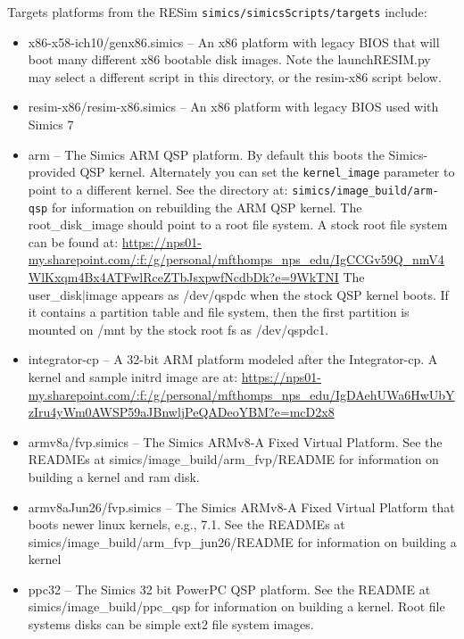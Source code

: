 \documentclass[titlepage]{article}
\begin{document}
Targets platforms from the RESim {\tt simics/simicsScripts/targets} include:
\begin{itemize}
\item x86-x58-ich10/genx86.simics -- An x86 platform with legacy BIOS that will boot many different x86 bootable disk images. Note the launchRESIM.py may select
a different script in this directory, or the resim-x86 script below. 
\item resim-x86/resim-x86.simics -- An x86 platform with legacy BIOS used with Simics 7
\item arm -- The Simics ARM QSP platform.  By default this boots the Simics-provided QSP kernel.  Alternately you can set the {\tt kernel\_image} 
parameter to point to a different kernel.  See the directory at:
\newline
{\tt simics/image\_build/arm-qsp} for information on rebuilding the ARM QSP kernel.  The root\_disk\_image should point to a root file system.
A stock root file system can be found at: 
\newline
\url{https://nps01-my.sharepoint.com/:f:/g/personal/mfthomps\_nps\_edu/IgCCGv59Q\_nmV4WlKxqm4Bx4ATFwlRceZTbJsxpwfNcdbDk?e=9WkTNI}
The user\_disk|image appears as /dev/qspdc when the stock QSP kernel boots.  If it contains a partition table and file system, then the first
partition is mounted on /mnt by the stock root fs as /dev/qspdc1.

\item integrator-cp -- A 32-bit ARM platform modeled after the Integrator-cp.  A kernel and sample initrd image are at:
\newline
\url{https://nps01-my.sharepoint.com/:f:/g/personal/mfthomps\_nps\_edu/IgDAehUWa6HwUbYzIru4yWm0AWSP59aJBnwljPeQADeoYBM?e=mcD2x8}

\item armv8a/fvp.simics -- The Simics ARMv8-A Fixed Virtual Platform.  See the READMEs at simics/image\_build/arm\_fvp/README for information on building a kernel
and ram disk.

\item armv8aJun26/fvp.simics -- The Simics ARMv8-A Fixed Virtual Platform that boots newer linux kernels, e.g., 7.1.  
See the READMEs at simics/image\_build/arm\_fvp\_jun26/README for information on building a kernel

\item ppc32 -- The Simics 32 bit PowerPC QSP platform.  See the README at simics/image\_build/ppc\_qsp for information on building a kernel. Root
file systems disks can be simple ext2 file system images.
\end{itemize}
\end{document}
